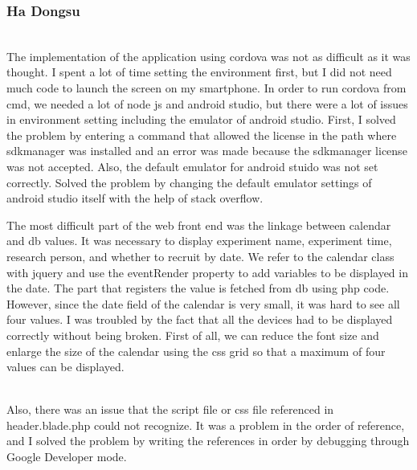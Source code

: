 \documentclass[letterpaper, 10 pt, conference]{ieeeconf}  %
\begin{document}
\subsubsection{Ha Dongsu\\}
\\The implementation of the application using cordova was not as difficult as it was thought. I spent a lot of time setting the environment first, but I did not need much code to launch the screen on my smartphone. In order to run cordova from cmd, we needed a lot of node js and android studio, but there were a lot of issues in environment setting including the emulator of android studio. First, I solved the problem by entering a command that allowed the license in the path where sdkmanager was installed and an error was made because the sdkmanager license was not accepted. Also, the default emulator for android stuido was not set correctly. Solved the problem by changing the default emulator settings of android studio itself with the help of stack overflow. \\
The most difficult part of the web front end was the linkage between calendar and db values. It was necessary to display experiment name, experiment time, research person, and whether to recruit by date. We refer to the calendar class with jquery and use the eventRender property to add variables to be displayed in the date. The part that registers the value is fetched from db using php code. However, since the date field of the calendar is very small, it was hard to see all four values. I was troubled by the fact that all the devices had to be displayed correctly without being broken. First of all, we can reduce the font size and enlarge the size of the calendar using the css grid so that a maximum of four values can be displayed.\\
\\Also, there was an issue that the script file or css file referenced in header.blade.php could not recognize. It was a problem in the order of reference, and I solved the problem by writing the references in order by debugging through Google Developer mode.\\
\end{document}
